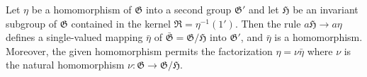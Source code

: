 Let $\eta$ be a homomorphism of $\mathfrak{G}$ into a second group $\mathfrak{G}'$ and let $\mathfrak{H}$ be an invariant subgroup of $\mathfrak{G}$ contained in the kernel $\mathfrak{R} = \eta^{-1}(1')$. Then the rule $a\mathfrak{H} \rightarrow a\eta$ defines a single-valued mapping $\bar{\eta}$ of $\bar{\mathfrak{G}} = \mathfrak{G}/\mathfrak{H}$ into $\mathfrak{G}'$, and $\bar{\eta}$ is a homomorphism. Moreover, the given homomorphism permits the factorization $\eta = \nu\bar{\eta}$ where $\nu$ is the natural homomorphism $\nu: \mathfrak{G} \to \mathfrak{G}/\mathfrak{H}$.
